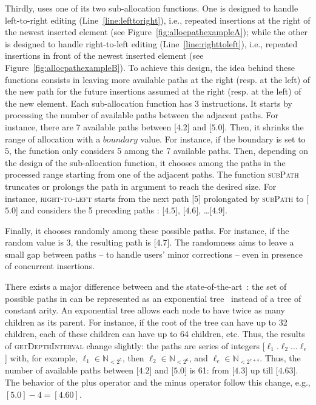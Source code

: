 \noindent Thirdly, \LSEQ uses one of its two sub-allocation functions. One is
designed to handle left-to-right editing (Line~\ref{line:lefttoright}), i.e.,
repeated insertions at the right of the newest inserted element (see
Figure~\ref{fig:allocpathexampleA}); while the other is designed to handle
right-to-left editing (Line~\ref{line:righttoleft}), i.e., repeated insertions
in front of the newest inserted element (see
Figure~\ref{fig:allocpathexampleB}). To achieve this design, the idea behind
these functions consists in leaving more available paths at the right (resp. at
the left) of the new path for the future insertions assumed at the right
(resp. at the left) of the new element. Each sub-allocation function has 3
instructions. It starts by processing the number of available paths between the
adjacent paths. For instance, there are 7 available paths between [$4.2$] and
[$5.0$]. Then, it shrinks the range of allocation with a $boundary$ value. For
instance, if the boundary is set to $5$, the function only considers 5 among the
7 available paths. Then, depending on the design of the sub-allocation function,
it chooses among the paths in the processed range starting from one of the
adjacent paths. The function \textsc{subPath} truncates or prolongs the path in
argument to reach the desired size. For instance, \textsc{right-to-left} starts
from the next path [$5$] prolongated by \textsc{subPath} to [$5.0$] and
considers the 5 preceding paths : [$4.5$], [$4.6$], \ldots [$4.9$].

\noindent Finally, it chooses randomly among these possible paths. For instance,
if the random value is 3, the resulting path is [$4.7$]. The randomness aims to
leave a small gap between paths -- to handle users' minor corrections -- even in
presence of concurrent insertions.

There exists a major difference between \LSEQ and the
state-of-the-art~\cite{preguica2009commutative, weiss2009logoot}: the set of
possible paths in \LSEQ can be represented as an exponential
tree~\cite{andersson1996faster,andersson2007dynamic} instead of a tree of
constant arity. An exponential tree allows each node to have twice as many
children as its parent. For instance, if the root of the tree can have up to 32
children, each of these children can have up to 64 children, etc. Thus, the
results of \textsc{getDepthInterval} change slightly: the paths are series of
integers [$\ell_1.\ell_2\ldots\ell_e$] with, for example,
$\ell_1\in\mathbb{N}_{<2^5}$, then $\ell_2\in \mathbb{N}_{<2^6}$, and
$\ell_{e}\in\mathbb{N}_{<2^{e+4}}$. Thus, the number of available paths between
[$4.2$] and [$5.0$] is 61: from [$4.3$] up till [$4.63$]. The behavior of the
plus operator and the minus operator follow this change, e.g.,
$[5.0]- 4 = [4.60]$.

